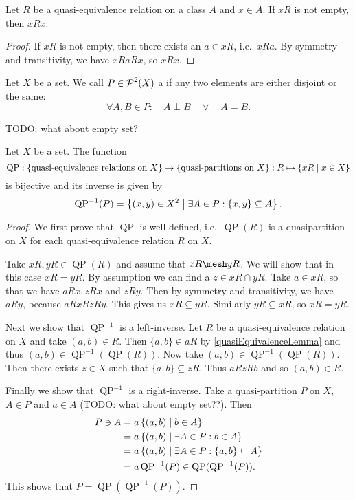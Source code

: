 \begin{lemma} \label{quasiEquivalenceLemma}
Let $R$ be a quasi-equivalence relation on a class $A$ and $x\in A$. If $xR$ is not empty, then $xRx$.
\end{lemma}
\begin{proof}
If $xR$ is not empty, then there exists an $a\in xR$, i.e.\ $xRa$. By symmetry and transitivity, we have $xRaRx$, so $xRx$.
\end{proof}

\begin{definition}
Let $X$ be a set. We call $P\in\operatorname{\mathcal{P}}^2(X)$ a  if any two elements are either disjoint or the same:
\[ \forall A,B\in P: \quad A\perp B \quad\lor\quad A=B. \]
\end{definition}

TODO: what about empty set?

\begin{proposition}
Let $X$ be a set. The function
\[ \operatorname{QP}: \{\text{quasi-equivalence relations on $X$}\} \to \{\text{quasi-partitions on $X$}\}: R\mapsto \left\{ xR \;\middle|\; x\in X \right\} \]
is bijective and its inverse is given by
\[ \operatorname{QP}^{-1}(P) = \left\{ (x,y)\in X^2 \;\middle|\; \exists A\in P: \{x,y\}\subseteq A \right\}. \]
\end{proposition}
\begin{proof}
We first prove that $\operatorname{QP}$ is well-defined, i.e.\ $\operatorname{QP}(R)$ is a quasipartition on $X$ for each quasi-equivalence relation $R$ on $X$.

Take $xR,yR\in \operatorname{QP}(R)$ and assume that $xR\mesh yR$. We will show that in this case $xR = yR$. By assumption we can find a $z\in xR\cap yR$. Take $a\in xR$, so that we have $aRx, zRx$ and $zRy$. Then by symmetry and transitivity, we have $aRy$, because $aRxRzRy$. This gives us $xR\subseteq yR$. Similarly $yR\subseteq xR$, so $xR=yR$.

Next we show that $\operatorname{QP}^{-1}$ is a left-inverse.
Let $R$ be a quasi-equivalence relation on $X$ and take $(a,b)\in R$. Then $\{a,b\}\in aR$ by \ref{quasiEquivalenceLemma} and thus $(a,b)\in \operatorname{QP}^{-1}(\operatorname{QP}(R))$.
Now take $(a,b)\in \operatorname{QP}^{-1}(\operatorname{QP}(R))$. Then there exists $z\in X$ such that $\{a,b\}\subseteq zR$. Thus $aRzRb$ and so $(a,b)\in R$.

Finally we show that $\operatorname{QP}^{-1}$ is a right-inverse. Take a quasi-partition $P$ on $X$, $A\in P$ and $a\in A$ (TODO: what about empty set??). Then
\begin{align*}
P \ni A &= a\left\{ (a,b) \;\middle|\; b\in A \right\} \\
&= a\left\{ (a,b) \;\middle|\; \exists A\in P: b\in A \right\} \\
&= a\left\{ (a,b) \;\middle|\; \exists A\in P: \{a,b\}\subseteq A \right\} \\
&= a\operatorname{QP}^{-1}(P) \in \operatorname{QP}(\operatorname{QP}^{-1}(P)).
\end{align*}
This shows that $P = \operatorname{QP}(\operatorname{QP}^{-1}(P))$.
\end{proof}

